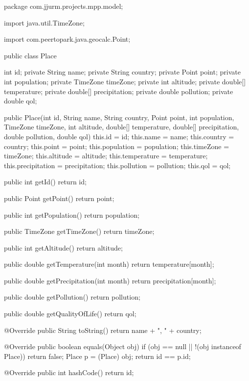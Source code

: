 \begin{javacode}
package com.jjurm.projects.mpp.model;

import java.util.TimeZone;

import com.peertopark.java.geocalc.Point;

public class Place {

  int id;
  private String name;
  private String country;
  private Point point;
  private int population;
  private TimeZone timeZone;
  private int altitude;
  private double[] temperature;
  private double[] precipitation;
  private double pollution;
  private double qol;

  public Place(int id, String name, String country, Point point, int population, TimeZone timeZone,
      int altitude, double[] temperature, double[] precipitation, double pollution, double qol) {
    this.id = id;
    this.name = name;
    this.country = country;
    this.point = point;
    this.population = population;
    this.timeZone = timeZone;
    this.altitude = altitude;
    this.temperature = temperature;
    this.precipitation = precipitation;
    this.pollution = pollution;
    this.qol = qol;
  }

  public int getId() {
    return id;
  }

  public Point getPoint() {
    return point;
  }

  public int getPopulation() {
    return population;
  }

  public TimeZone getTimeZone() {
    return timeZone;
  }

  public int getAltitude() {
    return altitude;
  }

  public double getTemperature(int month) {
    return temperature[month];
  }

  public double getPrecipitation(int month) {
    return precipitation[month];
  }

  public double getPollution() {
    return pollution;
  }

  public double getQualityOfLife() {
    return qol;
  }

  @Override
  public String toString() {
    return name + ", " + country;
  }

  @Override
  public boolean equals(Object obj) {
    if (obj == null || !(obj instanceof Place))
      return false;
    Place p = (Place) obj;
    return id == p.id;
  }

  @Override
  public int hashCode() {
    return id;
  }

}
\end{javacode}

